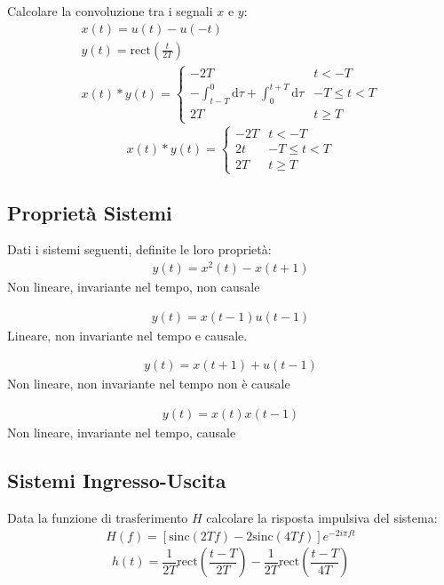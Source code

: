 \documentclass{article}
\newcommand{\rect}{\mbox{rect}}
\newcommand{\sinc}{\mbox{sinc}}
\newcommand{\df}{\mathrm{d}}
\begin{document}
Calcolare la convoluzione tra i segnali $x$ e $y$:
\begin{gather*}
    x(t)=u(t)-u(-t)\\
    y(t)=\rect\displaystyle\left(\frac{t}{2T}\right)\\
    x(t)*y(t)=\begin{cases}
        -2T&t<-T\\
        \displaystyle-\int_{t-T}^{0}\df\tau+\int_{0}^{t+T}\df\tau &-T\leq t<T\\
        2T &t\geq T
    \end{cases}
\end{gather*}
\begin{equation}
    x(t)*y(t)=\begin{cases}
        -2T&t<-T\\
        2t&-T\leq t<T\\
        2T &t\geq T
    \end{cases}
\end{equation}

\subsection{Proprietà Sistemi}

Dati i sistemi seguenti, definite le loro proprietà: 
\begin{gather*}
    y(t)=x^2(t)-x(t+1)
\end{gather*}
Non lineare, invariante nel tempo, non causale

\begin{gather*}
    y(t)=x(t-1)u(t-1)
\end{gather*}
Lineare, non invariante nel tempo e causale. 

\begin{gather*}
    y(t)=x(t+1)+u(t-1)
\end{gather*}
Non lineare, non invariante nel tempo non è causale

\begin{gather*}
    y(t)=x(t)x(t-1)
\end{gather*}
Non lineare, invariante nel tempo, causale

\subsection{Sistemi Ingresso-Uscita}

Data la funzione di trasferimento $H$ calcolare la risposta impulsiva del sistema:
\begin{gather*}
    H(f)=\left[\sinc\displaystyle(2Tf)-2\sinc(4Tf)\right]e^{-2i\pi ft}
\end{gather*}
\begin{equation}
    h(t)=\displaystyle\frac{1}{2T}\rect\left(\frac{t-T}{2T}\right)-\frac{1}{2T}\rect\left(\frac{t-T}{4T}\right)
\end{equation}
\end{document}

